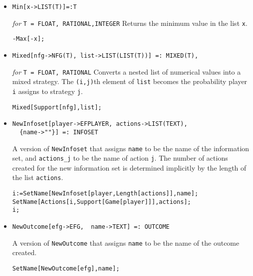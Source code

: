 \begin{itemize}
\item{}
\protect \large \begin{verbatim}
Min[x->LIST(T)]=:T
\end{verbatim}\normalsize

{\it for} {\tt T = FLOAT, RATIONAL,INTEGER}
\bd 
Returns the minimum value in the list \verb+x+.  
\begin{verbatim}
-Max[-x];
\end{verbatim} 
\ed

\item{}
\protect \large \begin{verbatim}
Mixed[nfg->NFG(T), list->LIST(LIST(T))] =: MIXED(T),
\end{verbatim}\normalsize

{\it for} {\tt T = FLOAT, RATIONAL}
\bd 
Converts a nested list of numerical values into a mixed strategy.  The
\verb+(i,j)+th element of \verb+list+ becomes the probability
player \verb+i+ assigns to strategy \verb+j+. 
\begin{verbatim}
Mixed[Support[nfg],list];
\end{verbatim} 
\ed

\item{}
\protect \large \begin{verbatim}
NewInfoset[player->EFPLAYER, actions->LIST(TEXT), 
  {name->""}] =: INFOSET
\end{verbatim}\normalsize

\bd 
A version of \verb+NewInfoset+ that assigns \verb+name+ to be the name
of the information set, and \verb+actions_j+ to be the name of action
\verb+j+.  The number of actions created for the new information set
is determined implicitly by the length of the list \verb+actions+.  
\begin{verbatim}
i:=SetName[NewInfoset[player,Length[actions]],name];
SetName[Actions[i,Support[Game[player]]],actions];
i;
\end{verbatim} 
\ed

\item{}
\protect \large \begin{verbatim}
NewOutcome[efg->EFG,  name->TEXT] =: OUTCOME
\end{verbatim}\normalsize

\bd 
A version of \verb+NewOutcome+ that assigns \verb+name+ to be the name
of the outcome created.  
\begin{verbatim}
SetName[NewOutcome[efg],name];
\end{verbatim} 
\ed


\end{itemize}
